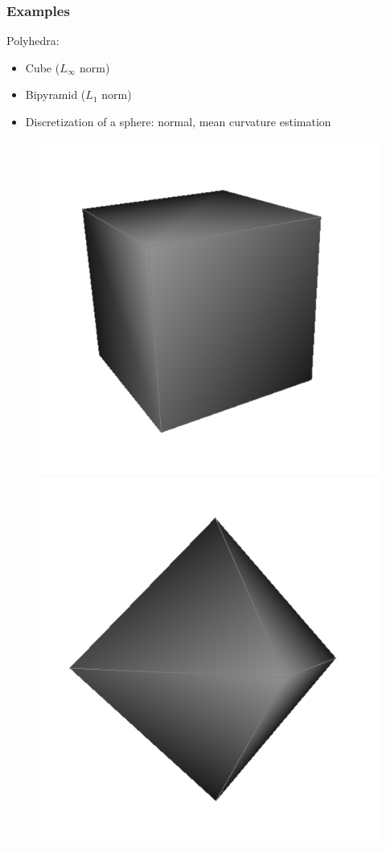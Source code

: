 \documentclass{beamer}
\begin{document}
\begin{frame}
    \frametitle{Examples}

    Polyhedra:
    \begin{itemize}
        \item Cube ($ L_{\infty} $ norm)
        \item Bipyramid ($ L_1 $ norm)
        \item Discretization of a sphere: normal, mean curvature estimation
    \end{itemize}

    \begin{figure}
        \centering
        \includegraphics[scale=0.2]{img/cube}
        \includegraphics[scale=0.2]{img/bipyramid}

\end{figure}
\end{frame}
\end{document}
